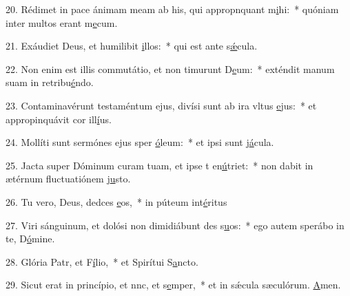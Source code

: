 20. Rédimet in pace ánimam meam ab his, qui appropnquant m\uline{i}hi:~* quóniam inter multos erant m\uline{e}cum.\par 
21. Exáudiet Deus, et humilibit \uline{i}llos:~* qui est ante s\uline{ǽ}cula.\par 
22. Non enim est illis commutátio, et non timurunt D\uline{e}um:~* exténdit manum suam in retribu\uline{é}ndo.\par 
23. Contaminavérunt testaméntum ejus, divísi sunt ab ira vltus \uline{e}jus:~* et appropinquávit cor ill\uline{í}us.\par 
24. Mollíti sunt sermónes ejus sper \uline{ó}leum:~* et ipsi sunt j\uline{á}cula.\par 
25. Jacta super Dóminum curam tuam, et ipse t en\uline{ú}triet:~* non dabit in ætérnum fluctuatiónem j\uline{u}sto.\par 
26. Tu vero, Deus, dedces \uline{e}os,~* in púteum int\uline{é}ritus\par 
27. Viri sánguinum, et dolósi non dimidiábunt des s\uline{u}os:~* ego autem sperábo in te, D\uline{ó}mine.\par 
28. Glória Patr, et F\uline{í}lio,~* et Spirítui S\uline{a}ncto.\par 
29. Sicut erat in princípio, et nnc, et s\uline{e}mper,~* et in sǽcula sæculórum. \uline{A}men.\par 
